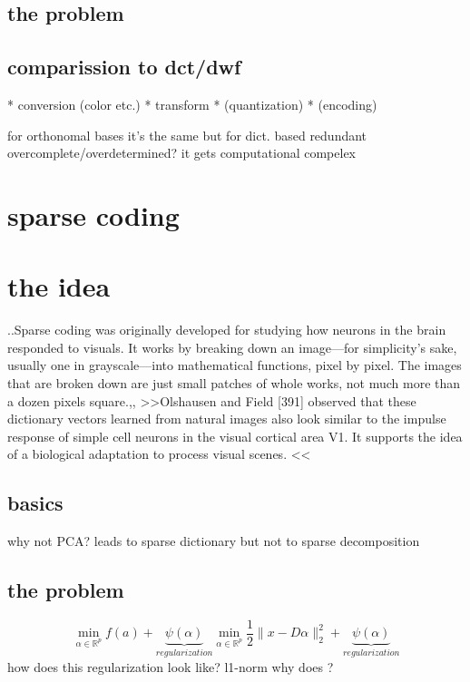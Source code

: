 \subsection{the problem}
\subsection{comparission to dct/dwf}
\begin{frame}
* conversion (color etc.)
* transform
* (quantization)
* (encoding)

for orthonomal bases it's the same but for dict. based redundant overcomplete/overdetermined?
it gets computational compelex

\end{frame}


\section{sparse coding}
\begin{frame}
\end{frame}
\section{the idea}
..Sparse coding was originally developed for studying how neurons in the brain responded to visuals. It works by breaking down an image—for simplicity's sake, usually one in grayscale—into mathematical functions, pixel by pixel. The images that are broken down are just small patches of whole works, not much more than a dozen pixels square.,,
>>Olshausen and Field [391] observed that these
dictionary vectors learned from natural images also look similar to the impulse
response of simple cell neurons in the visual cortical area V1. It supports the idea
of a biological adaptation to process visual scenes. <<

\subsection{basics}
\begin{frame}
why not PCA? leads to sparse dictionary but not to sparse decomposition
\end{frame}
\subsection{the problem}

\begin{frame}
\[ 
\min_{\alpha\in\mathbb{R}^{p}} f(a) + \underbrace{\psi(\alpha)}_{regularization}
\min_{\alpha\in\mathbb{R}^{p}} \frac{1}{2} \lVert x - D\alpha \rVert^{2}_{2} + \underbrace{\psi(\alpha)}_{regularization}
\] 
how does this regularization look like?
l1-norm
why does ?
\end{frame}
